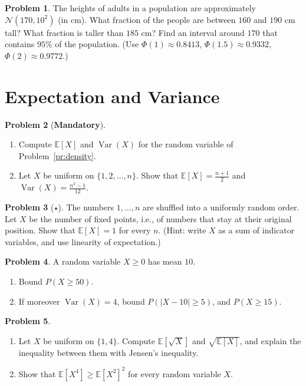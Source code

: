 \documentclass[11pt]{article}
\theoremstyle{definition}
\newtheorem{problem}{Problem}[section]
\newcommand{\mandatory}{\textcolor{red!70!black}{\textbf{Mandatory}}}
\newcommand{\E}{\mathbb{E}}
\DeclareMathOperator{\Var}{Var}
\begin{document}
\begin{problem}\label{pr:heights}
    The heights of adults in a population are approximately $\mathcal{N}(170, 10^2)$ (in cm). What fraction of the people are between $160$ and $190$ cm tall? What fraction is taller than $185$ cm? Find an interval around $170$ that contains $95\%$ of the population. (Use $\Phi(1) \approx 0.8413$, $\Phi(1.5) \approx 0.9332$, $\Phi(2) \approx 0.9772$.)
\end{problem}

\section{Expectation and Variance}

\begin{problem}[\mandatory]\label{pr:density-moments}
    \begin{enumerate}[label=(\alph*)]
        \item Compute $\E[X]$ and $\Var(X)$ for the random variable of Problem~\ref{pr:density}.
        \item Let $X$ be uniform on $\{1, 2, \ldots, n\}$. Show that $\E[X] = \frac{n + 1}{2}$ and $\Var(X) = \frac{n^2 - 1}{12}$.
    \end{enumerate}
\end{problem}

\begin{problem}[$\star$]\label{pr:fixed-points}
    The numbers $1, \ldots, n$ are shuffled into a uniformly random order. Let $X$ be the number of fixed points, i.e., of numbers that stay at their original position. Show that $\E[X] = 1$ for every $n$. (Hint: write $X$ as a sum of indicator variables, and use linearity of expectation.)
\end{problem}

\begin{problem}\label{pr:markov-chebyshev}
    A random variable $X \geq 0$ has mean $10$.
    \begin{enumerate}[label=(\alph*)]
        \item Bound $P(X \geq 50)$.
        \item If moreover $\Var(X) = 4$, bound $P(|X - 10| \geq 5)$, and $P(X \geq 15)$.
    \end{enumerate}
\end{problem}

\begin{problem}\label{pr:jensen}
    \begin{enumerate}[label=(\alph*)]
        \item Let $X$ be uniform on $\{1, 4\}$. Compute $\E[\sqrt{X}]$ and $\sqrt{\E[X]}$, and explain the inequality between them with Jensen's inequality.
        \item Show that $\E[X^4] \geq \E[X^2]^2$ for every random variable $X$.
    \end{enumerate}
\end{problem}
\end{document}
